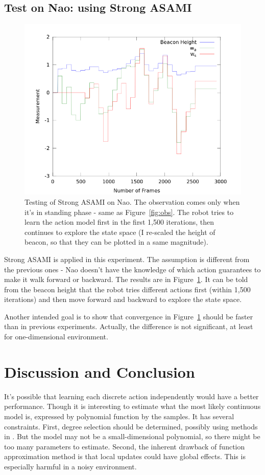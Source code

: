 \documentclass[10pt]{article}
\begin{document}
\subsection{Test on Nao: using Strong ASAMI}

\begin{figure}[h]
\centering
\includegraphics[width=0.7\columnwidth]{out_strong.png}
\caption{Testing of Strong ASAMI on Nao. The observation comes only
when it's in standing phase - same as Figure~\ref{fig:obs}. The robot
tries to learn the action model first in the first 1,500 iterations,
then continues to explore the state space (I re-scaled the height of
beacon, so that they can be plotted in a same magnitude).}
\label{fig:obs_strong}
\end{figure}

Strong ASAMI is applied in this experiment. The assumption is
different from the previous ones - Nao doesn't have the knowledge of
which action guarantees to make it walk forward or backward. The
results are in Figure~\ref{fig:obs_strong}. It can be told from the
beacon height that the robot tries different actions first (within
1,500 iterations) and then move forward and backward to explore the
state space.

Another intended goal is to show that convergence in
Figure~\ref{fig:obs_strong} should be faster than in previous
experiments. Actually, the difference is not significant, at least for
one-dimensional environment.

\section{Discussion and Conclusion}
\label{sec:dis}

It's possible that learning each discrete action independently would
have a better performance. Though it is interesting to estimate what
the most likely continuous model is, expressed by polynomial function by
the samples. It has several constraints. First, degree selection
should be determined, possibly using methods in
\cite{IJAIT08-stronger}. But the model may not be a small-dimensional
polynomial, so there might be too many parameters to estimate. Second,
the inherent drawback of function approximation method is that local
updates could have global effects. This is especially harmful in a
noisy environment.
\end{document}
